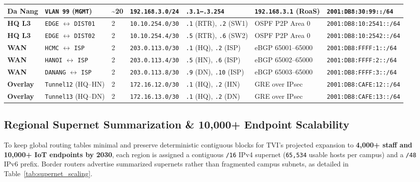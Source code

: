 \begin{table}[H]
\begin{tabularx}{\textwidth}{|p{1.25cm}|p{2.2cm}|p{0.85cm}|p{2.0cm}|p{2.15cm}|p{1.85cm}|X|}
\hline
\textbf{Da Nang} & \texttt{VLAN 99} (\texttt{MGMT}) & \textasciitilde 20 & \texttt{192.168.3.0/24} & \texttt{.3.1--.3.254} & \texttt{192.168.3.1} (RoaS) & \texttt{2001:DB8:30:99::/64} \\
\hline
\textbf{HQ L3} & \texttt{EDGE} $\leftrightarrow$ \texttt{DIST01} & 2 & \texttt{10.10.254.0/30} & \texttt{.1} (RTR), \texttt{.2} (SW1) & OSPF P2P Area 0 & \texttt{2001:DB8:10:2541::/64} \\
\hline
\textbf{HQ L3} & \texttt{EDGE} $\leftrightarrow$ \texttt{DIST02} & 2 & \texttt{10.10.254.4/30} & \texttt{.5} (RTR), \texttt{.6} (SW2) & OSPF P2P Area 0 & \texttt{2001:DB8:10:2542::/64} \\
\hline
\textbf{WAN} & \texttt{HCMC} $\leftrightarrow$ \texttt{ISP} & 2 & \texttt{203.0.113.0/30} & \texttt{.1} (HQ), \texttt{.2} (ISP) & eBGP 65001--65000 & \texttt{2001:DB8:FFFF:1::/64} \\
\hline
\textbf{WAN} & \texttt{HANOI} $\leftrightarrow$ \texttt{ISP} & 2 & \texttt{203.0.113.4/30} & \texttt{.5} (HN), \texttt{.6} (ISP) & eBGP 65002--65000 & \texttt{2001:DB8:FFFF:2::/64} \\
\hline
\textbf{WAN} & \texttt{DANANG} $\leftrightarrow$ \texttt{ISP} & 2 & \texttt{203.0.113.8/30} & \texttt{.9} (DN), \texttt{.10} (ISP) & eBGP 65003--65000 & \texttt{2001:DB8:FFFF:3::/64} \\
\hline
\textbf{Overlay} & \texttt{Tunnel12} (HQ--HN) & 2 & \texttt{172.16.12.0/30} & \texttt{.1} (HQ), \texttt{.2} (HN) & GRE over IPsec & \texttt{2001:DB8:CAFE:12::/64} \\
\hline
\textbf{Overlay} & \texttt{Tunnel13} (HQ--DN) & 2 & \texttt{172.16.13.0/30} & \texttt{.1} (HQ), \texttt{.2} (DN) & GRE over IPsec & \texttt{2001:DB8:CAFE:13::/64} \\
\hline
\end{tabularx}
\end{table}

\subsection{Regional Supernet Summarization \& 10,000+ Endpoint Scalability}
To keep global routing tables minimal and preserve deterministic contiguous blocks for TVI's projected expansion to \textbf{4,000+ staff and 10,000+ IoT endpoints by 2030}, each region is assigned a contiguous \texttt{/16} IPv4 supernet (\texttt{65,534} usable hosts per campus) and a \texttt{/48} IPv6 prefix. Border routers advertise summarized supernets rather than fragmented campus subnets, as detailed in Table~\ref{tab:supernet_scaling}.

